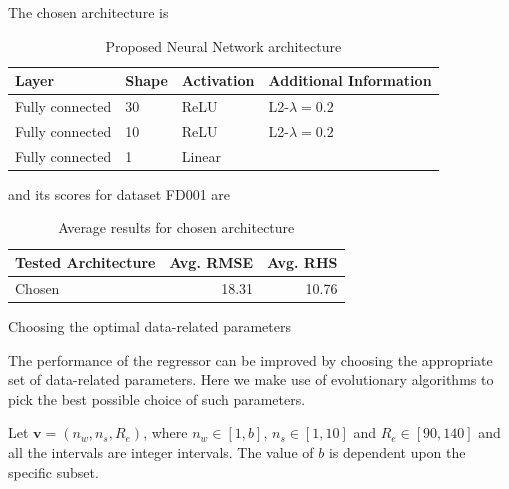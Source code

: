 \documentclass{beamer}
\begin{document}
\begin{darkframes}
     \begin{frame}
     
	The chosen architecture is     
     
     \begin{table}[!htb]
	\centering
		\begin{tabular}{l l l l}
		\hline
		Layer & Shape & Activation & Additional Information\\
  		\hline
  		Fully connected & 30 & ReLU & L2-$\lambda = 0.2$\\
  		Fully connected & 10 & ReLU & L2-$\lambda = 0.2$\\
  		Fully connected & 1 & Linear & \\
  		\hline
	\end{tabular}
	\caption{Proposed Neural Network architecture}
	\label{table:proposed_nn}
	\end{table}
	
	and its scores for dataset FD001 are
	
	\begin{table}[!htb]
	\centering
	\begin{tabular}{l | r | r}
	\hline	
	Tested Architecture & Avg. RMSE  & Avg. RHS \\
  	\hline
  	Chosen & 18.31 & 10.76\\
  	\hline
	\end{tabular}
	\caption{Average results for chosen architecture}
	\label{table:tested_architectures_100}
	\end{table}
      
    \end{frame}
    
    \begin{frame}{Choosing the optimal data-related parameters}
      
	The performance of the regressor can be improved by choosing the appropriate set of data-related parameters. Here we make use of evolutionary algorithms to pick the best possible choice of such parameters. \vspace{1em}
	
	 Let $\mathbf{v} = (n_w, n_s, R_e)$, where $n_w \in \left[1, b\right]$, $n_s \in \left[1, 10\right]$ and $R_e \in \left[90, 140 \right]$ and all the intervals are integer intervals. The value of $b$ is dependent upon the specific subset.      
     
     \end{frame}
     

\end{darkframes}
\end{document}
